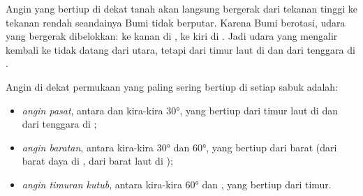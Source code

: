 Angin yang bertiup di dekat tanah akan langsung bergerak dari tekanan
tinggi ke tekanan rendah seandainya Bumi tidak berputar. Karena Bumi
berotasi, udara yang bergerak dibelokkan: ke kanan di ,
ke kiri di . Jadi udara yang mengalir kembali ke
 tidak datang dari utara, tetapi dari timur laut di  dan dari tenggara di .

\begin{definition}\label{def:g8:winds-global-circulation:global-winds}
Angin di dekat permukaan yang paling sering bertiup di setiap sabuk 
adalah:
\begin{itemize}
  \item \emph{angin pasat}, antara  dan
        kira-kira \ang{30}, yang bertiup dari timur laut di  dan dari tenggara di ;
  \item \emph{angin baratan}, antara kira-kira \ang{30}
        dan \ang{60}, yang bertiup dari barat (dari barat daya di , dari barat laut di );
  \item \emph{angin timuran kutub}, antara
        kira-kira \ang{60} dan , yang bertiup dari timur.
\end{itemize}
\end{definition}

